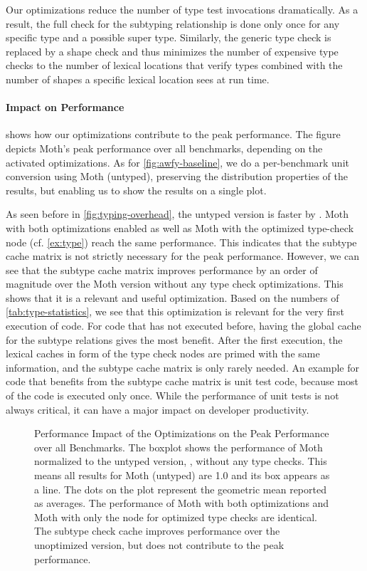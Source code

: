 Our optimizations reduce the number of type test invocations dramatically.
As a result, the full check for the subtyping relationship is done only once for
any specific type and a possible super type.
Similarly, the generic type check is replaced by a shape check
and thus minimizes the number of expensive type checks
to the number of lexical locations that verify types
combined with the number of shapes a specific lexical
location sees at run time.

\paragraph*{Impact on Performance}
\label{sec:eval-opt-perf}

 shows how our optimizations contribute
to the peak performance.
The figure depicts Moth's peak performance over
all benchmarks, depending on the activated optimizations.
As for \cref{fig:awfy-baseline},
we do a per-benchmark unit conversion using Moth (untyped),
preserving the distribution properties of the results,
but enabling us to show the results on a single plot.

As seen before in \cref{fig:typing-overhead}, the untyped version is faster by \OverheadTypingGMeanP.
Moth with both optimizations enabled as well as
Moth with the optimized type-check node (cf. \cref{ex:type})
reach the same performance.
This indicates that the subtype cache matrix is not strictly necessary for
the peak performance.
However, we can see that the subtype cache matrix improves performance
by an order of magnitude over the Moth version without any type check optimizations.
This shows that it is a relevant and useful optimization.
Based on the numbers of \cref{tab:type-statistics},
we see that this optimization is relevant for the very first execution of code.
For code that has not executed before,
having the global cache for the subtype relations gives the most benefit.
After the first execution, the lexical caches in form of the type check nodes
are primed with the same information, and the subtype cache matrix is only rarely needed.
An example for code that benefits from the subtype cache matrix is unit test code,
because most of the code is executed only once.
While the performance of unit tests is not always critical,
it can have a major impact on developer productivity.

\begin{figure}[htb]
  \centering
	\OptimizationOverview{}
  \caption{Performance Impact of the Optimizations on the Peak Performance over all Benchmarks.
  The boxplot shows the performance of Moth normalized to the untyped version, \ie,
  without any type checks.
  This means all results for Moth (untyped) are 1.0 and its box appears as a line.
  The dots on the plot represent the geometric mean reported as averages.
  The performance of Moth with both optimizations and Moth
  with only the node for optimized type checks are identical.
  The subtype check cache improves performance over the unoptimized version,
  but does not contribute to the peak performance.
  }
	\label{fig:perf-impact-optimization}
\end{figure}

